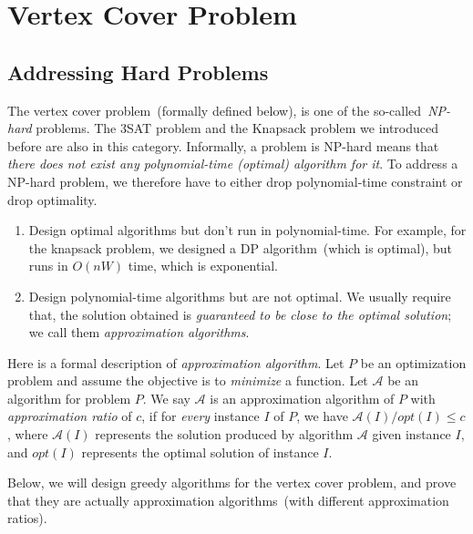 \setcounter{definition}{0} \setcounter{property}{0} \setcounter{claim}{0} \setcounter{fact}{0} \setcounter{corollary}{0} \setcounter{figure}{0}
\section{Vertex Cover Problem}

\subsection*{Addressing Hard Problems}

The vertex cover problem~(formally defined below), is one of the
so-called~\emph{NP-hard} problems.  The 3SAT problem and the Knapsack problem
we introduced before are also in this category.  Informally, a problem is
{NP-hard} means that \emph{there does not exist any polynomial-time (optimal)
algorithm for it}. To address a NP-hard problem, we therefore have to either
drop polynomial-time constraint or drop optimality.

\vspace*{-\topsep}
\begin{enumerate}
\item Design optimal algorithms but don't run in polynomial-time.
For example, for the knapsack problem, we designed a DP algorithm~(which
is optimal), but runs in $O(nW)$ time, which is exponential.
\item Design polynomial-time algorithms but are not optimal.
We usually require that, the solution obtained is \emph{guaranteed
to be close to the optimal solution}; we call them \emph{approximation algorithms}.
\end{enumerate}

Here is a formal description of \emph{approximation algorithm}.
Let $P$ be an optimization problem and assume the objective
is to \emph{minimize} a function.
Let $\mathcal{A}$ be an algorithm for problem $P$. We say $\mathcal{A}$
is an approximation algorithm of $P$ with \emph{approximation ratio} of $c$, if for \emph{every} instance
$I$ of $P$, we have $\mathcal{A}(I) / opt(I) \le c$,
where $\mathcal{A}(I)$ represents the solution produced by algorithm $\mathcal{A}$ given instance $I$,
and $opt(I)$ represents the optimal solution of instance $I$.

Below, we will design greedy algorithms for the vertex cover problem, and
prove that they are actually approximation algorithms~(with different approximation ratios).

